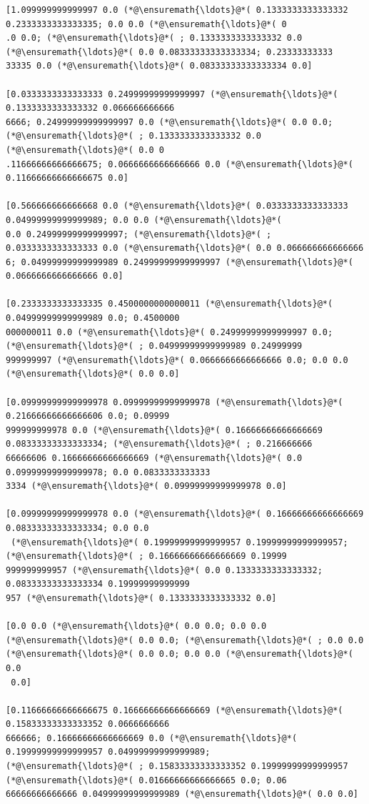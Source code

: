 \documentclass[12pt,a4paper]{article}
\begin{document}
\begin{lstlisting}
[1.099999999999997 0.0 (*@\ensuremath{\ldots}@*( 0.1333333333333332 0.2333333333333335; 0.0 0.0 (*@\ensuremath{\ldots}@*( 0
.0 0.0; (*@\ensuremath{\ldots}@*( ; 0.1333333333333332 0.0 (*@\ensuremath{\ldots}@*( 0.0 0.08333333333333334; 0.23333333333
33335 0.0 (*@\ensuremath{\ldots}@*( 0.08333333333333334 0.0]

[0.0333333333333333 0.24999999999999997 (*@\ensuremath{\ldots}@*( 0.1333333333333332 0.066666666666
6666; 0.24999999999999997 0.0 (*@\ensuremath{\ldots}@*( 0.0 0.0; (*@\ensuremath{\ldots}@*( ; 0.1333333333333332 0.0 (*@\ensuremath{\ldots}@*( 0.0 0
.11666666666666675; 0.0666666666666666 0.0 (*@\ensuremath{\ldots}@*( 0.11666666666666675 0.0]

[0.566666666666668 0.0 (*@\ensuremath{\ldots}@*( 0.0333333333333333 0.04999999999999989; 0.0 0.0 (*@\ensuremath{\ldots}@*( 
0.0 0.24999999999999997; (*@\ensuremath{\ldots}@*( ; 0.0333333333333333 0.0 (*@\ensuremath{\ldots}@*( 0.0 0.066666666666666
6; 0.04999999999999989 0.24999999999999997 (*@\ensuremath{\ldots}@*( 0.0666666666666666 0.0]

[0.2333333333333335 0.4500000000000011 (*@\ensuremath{\ldots}@*( 0.04999999999999989 0.0; 0.4500000
000000011 0.0 (*@\ensuremath{\ldots}@*( 0.24999999999999997 0.0; (*@\ensuremath{\ldots}@*( ; 0.04999999999999989 0.24999999
999999997 (*@\ensuremath{\ldots}@*( 0.0666666666666666 0.0; 0.0 0.0 (*@\ensuremath{\ldots}@*( 0.0 0.0]

[0.09999999999999978 0.09999999999999978 (*@\ensuremath{\ldots}@*( 0.21666666666666606 0.0; 0.09999
999999999978 0.0 (*@\ensuremath{\ldots}@*( 0.16666666666666669 0.08333333333333334; (*@\ensuremath{\ldots}@*( ; 0.216666666
66666606 0.16666666666666669 (*@\ensuremath{\ldots}@*( 0.0 0.09999999999999978; 0.0 0.0833333333333
3334 (*@\ensuremath{\ldots}@*( 0.09999999999999978 0.0]

[0.09999999999999978 0.0 (*@\ensuremath{\ldots}@*( 0.16666666666666669 0.08333333333333334; 0.0 0.0
 (*@\ensuremath{\ldots}@*( 0.19999999999999957 0.19999999999999957; (*@\ensuremath{\ldots}@*( ; 0.16666666666666669 0.19999
999999999957 (*@\ensuremath{\ldots}@*( 0.0 0.1333333333333332; 0.08333333333333334 0.19999999999999
957 (*@\ensuremath{\ldots}@*( 0.1333333333333332 0.0]

[0.0 0.0 (*@\ensuremath{\ldots}@*( 0.0 0.0; 0.0 0.0 (*@\ensuremath{\ldots}@*( 0.0 0.0; (*@\ensuremath{\ldots}@*( ; 0.0 0.0 (*@\ensuremath{\ldots}@*( 0.0 0.0; 0.0 0.0 (*@\ensuremath{\ldots}@*( 0.0
 0.0]

[0.11666666666666675 0.16666666666666669 (*@\ensuremath{\ldots}@*( 0.15833333333333352 0.0666666666
666666; 0.16666666666666669 0.0 (*@\ensuremath{\ldots}@*( 0.19999999999999957 0.04999999999999989; 
(*@\ensuremath{\ldots}@*( ; 0.15833333333333352 0.19999999999999957 (*@\ensuremath{\ldots}@*( 0.01666666666666665 0.0; 0.06
66666666666666 0.04999999999999989 (*@\ensuremath{\ldots}@*( 0.0 0.0]


\end{lstlisting}
\end{document}
